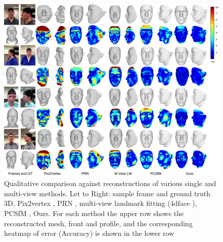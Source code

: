 \documentclass[10pt,twocolumn,letterpaper]{article}
\begin{document}
\begin{figure}
\begin{center}
   \includegraphics[width=0.95\linewidth]{images/qual_figure.pdf}
\end{center}
  \caption{Qualitative comparison against reconstructions of various single and multi-view methods. Let to Right: sample frame and ground truth 3D, Pix2vertex \cite{sela2017unrestricted}, PRN \cite{feng2018joint}, multi-view landmark fitting (4dface \cite{huber2016multiresolution}), PCSfM \cite{hernandez2017accurate}, Ours. For each method the upper row shows the reconstructed mesh, front and profile, and the corresponding heatmap of error (Accuracy) is shown in the lower row }
\label{fig:results}
\end{figure}

\end{document}
